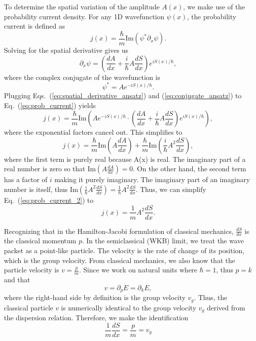 \documentclass[%
 aip,
 amsmath,amssymb,
 reprint,%
]{revtex4-1}
\begin{document}
To determine the spatial variation of the amplitude $A(x)$, we make use of the probability current density. For any 1D wavefunction $\psi(x)$, the probability current is defined as
\begin{equation}
\label{eq:prob_current}
j(x) = \frac{\hbar}{m} \text{Im}\left(\psi^* \partial_x \psi \right).
\end{equation}
Solving for the spatial derivative gives us
\begin{equation}
\label{eq:spatial_derivative_ansatz}
\partial_x \psi = \left(\frac{dA}{dx} + \frac{i}{\hbar} A\frac{dS}{dx} \right)e^{iS(x)/ \hbar},
\end{equation}
where the complex conjugate of the wavefunction is
\begin{equation}
\label{eq:conjugate_ansatz}
\psi^* = Ae^{-iS(x)/ \hbar}.
\end{equation}
Plugging Eqs.~(\ref{eq:spatial_derivative_ansatz}) and (\ref{eq:conjugate_ansatz}) to Eq.~(\ref{eq:prob_current}) yields
\begin{equation}
j(x) = \frac{\hbar}{m} \text{Im}\left(Ae^{-iS(x)/ \hbar} \cdot \left(\frac{dA}{dx} + \frac{i}{\hbar}A\frac{dS}{dx} \right)e^{iS(x)/ \hbar} \right),
\end{equation}
where the exponential factors cancel out. This simplifies to
\begin{equation}
\label{eq:prob_current_2}
j(x) = \frac{\hbar}{m} \text{Im}\left(A \frac{dA}{dx} \right) + \frac{\hbar}{m} \text{Im}\left(\frac{i}{\hbar}A^2 \frac{dS}{dx} \right),
\end{equation}
where the first term is purely real because A(x) is real. The imaginary part of a real number is zero so that $\text{Im}\left(A \frac{dA}{dx} \right) = 0$. On the other hand, the second term has a factor of $i$ making it purely imaginary. The imaginary part of an imaginary number is itself, thus $\text{Im}\left(\frac{i}{\hbar} A^2 \frac{dS}{dx} \right) = \frac{1}{\hbar} A^2 \frac{dS}{dx}$. Thus, we can simplify Eq.~(\ref{eq:prob_current_2}) to
\begin{equation}
\label{eq:prob_current_3}
j(x) = \frac{1}{m} A^2 \frac{dS}{dx}.
\end{equation}

Recognizing that in the Hamilton-Jacobi formulation of classical mechanics, $\frac{dS}{dx}$ is the classical momentum $p$. In the semiclassical (WKB) limit, we treat the wave packet as a point-like particle. The velocity is the rate of change of its position, which is the group velocity. From classical mechanics, we also know that the particle velocity is $v=\frac{p}{m}$. Since we work on natural units where $\hbar = 1$, thus $p=k$ and that
\begin{equation}
v=\partial_p E = \partial_k E,
\end{equation}
where the right-hand side by definition is the group velocity $v_g$. Thus, the classical particle $v$ is numerically identical to the group velocity $v_g$ derived from the dispersion relation. Therefore, we make the identification
\begin{equation}
\frac{1}{m} \frac{dS}{dx} = \frac{p}{m} = v_g
\end{equation}
\end{document}

